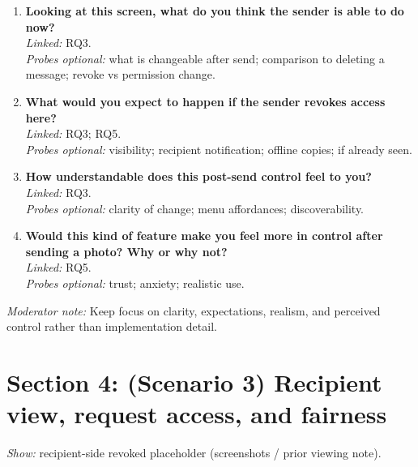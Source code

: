 \begin{enumerate}[resume]
  \item \textbf{Looking at this screen, what do you think the sender is able to do now?}\\
  \textit{Linked:} RQ3.\\
  \textit{Probes optional:} what is changeable after send; comparison to deleting a message; revoke vs permission change.

  \item \textbf{What would you expect to happen if the sender revokes access here?}\\
  \textit{Linked:} RQ3; RQ5.\\
  \textit{Probes optional:} visibility; recipient notification; offline copies; if already seen.

  \item \textbf{How understandable does this post-send control feel to you?}\\
  \textit{Linked:} RQ3.\\
  \textit{Probes optional:} clarity of change; menu affordances; discoverability.

  \item \textbf{Would this kind of feature make you feel more in control after sending a photo? Why or why not?}\\
  \textit{Linked:} RQ5.\\
  \textit{Probes optional:} trust; anxiety; realistic use.
\end{enumerate}

\textit{Moderator note:} Keep focus on clarity, expectations, realism, and perceived control rather than implementation detail.

\section{Section 4: (Scenario 3) Recipient view, request access, and fairness}
\textit{Show:} recipient-side revoked placeholder (screenshots / prior viewing note).


